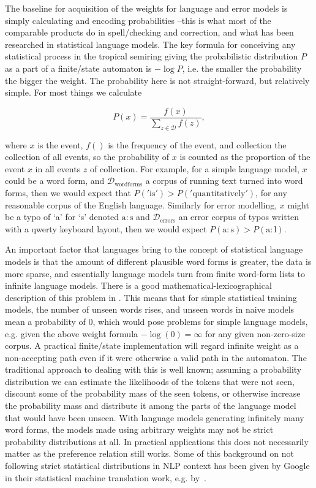 \documentclass[officiallayout,final]{unihelcompling}
\begin{document}
The baseline for acquisition of the weights for language and error models is
simply calculating and encoding probabilities --this is what most of the
comparable products do in spell\-/checking and correction, and what has been
researched in statistical language models. The key formula for conceiving any
statistical process in the tropical semiring giving the probabilistic
distribution $P$ as a part of a finite\-/state automaton is $-\log P$, i.e. the
smaller the probability the bigger the weight. The probability here is not
straight-forward, but relatively simple. For most things we calculate

\begin{equation} 
    P(x) = \frac{f(x)}{\sum_{z \in \mathcal{D}} f(z)},
\end{equation}

where $x$ is the event, $f()$ is the frequency of the event, and
\gls{collection} the collection of all events, so the probability of $x$ is
counted as the proportion of the event $x$ in all events $z$ of
\gls{collection}. For example, for a simple language model, $x$ could be a word
form, and $\mathcal{D}_\mathrm{word forms}$ a corpus of running text turned
into word forms, then we would expect that $P('\mathrm{is}') >
P('\mathrm{quantitatively}')$, for any reasonable corpus of the English
language. Similarly for error modelling, $x$ might be a typo of `a' for `s'
denoted $\mathrm{a}:\mathrm{s}$ and $\mathcal{D}_\mathrm{errors}$ an error
corpus of typos written with a qwerty keyboard layout, then we would expect
$P(\mathrm{a}:\mathrm{s}) > P(\mathrm{a}:\mathrm{l})$.

An important factor that  languages bring to the concept of
statistical language models is that the amount of different plausible word
forms is greater, the data is more sparse, and essentially language models turn
from finite word-form lists to infinite language models.  There is a good
mathematical-lexicographical description of this problem in
\citet{kornai2002many}. This means that for simple statistical training models,
the number of unseen words rises, and unseen words in naive models mean a
probability of $0$, which would pose problems for simple language models, e.g.
given the above weight formula $-\log(0) = \infty$ for any given non-zero-size
corpus. A practical finite\-/state implementation will regard infinite weight
as a non-accepting path even if it were otherwise a valid path in the
automaton.  The traditional approach to dealing with this is well known;
assuming a probability distribution we can estimate the likelihoods of the
tokens that were not seen, discount some of the probability mass of the seen
tokens, or otherwise increase the probability mass and distribute it among the
parts of the language model that would have been unseen. With language models
generating infinitely many word forms, the models made using arbitrary weights
may not be strict probability distributions at all. In practical applications
this does not necessarily matter as the preference relation still works. Some
of this background on not following strict statistical distributions in NLP
context has been given by Google in their statistical machine translation work,
e.g.  by~\citet{brants2007large}.
\end{document}
